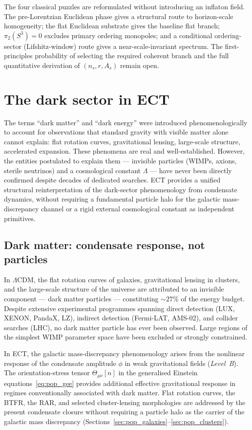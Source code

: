 \documentclass[11pt,a4paper]{article}
\begin{document}
The four classical puzzles are reformulated without introducing an inflaton field. The pre-Lorentzian Euclidean phase gives a structural route to horizon-scale homogeneity; the flat Euclidean substrate gives the baseline flat branch; $\pi_2(S^3)=0$ excludes primary ordering monopoles; and a conditional ordering-sector (Lifshitz-window) route gives a near-scale-invariant spectrum. The first-principles probability of selecting the required coherent branch and the full quantitative derivation of $(n_s,r,A_s)$ remain open.


\section{The dark sector in ECT}
\label{sec:pop_dark}

The terms ``dark matter'' and ``dark energy'' were introduced phenomenologically to account for observations that standard gravity with visible matter alone cannot explain: flat rotation curves, gravitational lensing, large-scale structure, accelerated expansion. These phenomena are real and well-established. However, the entities postulated to explain them --- invisible particles (WIMPs, axions, sterile neutrinos) and a cosmological constant $\Lambda$ --- have never been directly confirmed despite decades of dedicated searches. ECT provides a unified structural reinterpretation of the dark-sector phenomenology from condensate dynamics, without requiring a fundamental particle halo for the galactic mass-discrepancy channel or a rigid external cosmological constant as independent primitives.

\subsection{Dark matter: condensate response, not particles}

In $\Lambda$CDM, the flat rotation curves of galaxies, gravitational lensing in clusters, and the large-scale structure of the universe are attributed to an invisible component --- dark matter particles --- constituting $\sim 27\%$ of the energy budget. Despite extensive experimental programmes spanning direct detection (LUX, XENON, PandaX, LZ), indirect detection (Fermi-LAT, AMS-02), and collider searches (LHC), no dark matter particle has ever been observed. Large regions of the simplest WIMP parameter space have been excluded or strongly constrained.

In ECT, the galactic mass-discrepancy phenomenology arises from the nonlinear response of the condensate amplitude $\phi$ in weak gravitational fields (\emph{Level~B}). The orientation-stress tensor $\Theta_{\mu\nu}[n]$ in the generalised Einstein equations~\eqref{eq:pop_gee} provides additional effective gravitational response in regimes conventionally associated with dark matter. Flat rotation curves, the BTFR, the RAR, and selected cluster-lensing morphologies are addressed by the present condensate closure without requiring a particle halo as the carrier of the galactic mass discrepancy (Sections~\ref{sec:pop_galaxies}--\ref{sec:pop_clusters}).
\end{document}
